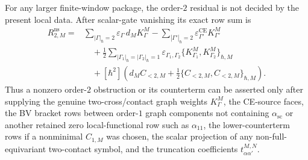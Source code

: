 \begin{prop}
  For any larger finite-window package, the order-\(2\) residual is not
  decided by the present local data.  After scalar-gate vanishing its
  exact row sum is
  \[
  \begin{aligned}
    R^{\mathrm{ns}}_{2,M}
     ={}&
      \sum_{|\Gamma|_\hbar=2}
        \varepsilon_\Gamma\,d_M K^M_\Gamma
      -\sum_{|\Gamma'|_\hbar=2}
        \varepsilon^{\mathrm{CE}}_{\Gamma'}K^M_{\Gamma'}\\
      &\quad
      +\frac12
      \sum_{|\Gamma_1|_\hbar=|\Gamma_2|_\hbar=1}
        \varepsilon_{\Gamma_1,\Gamma_2}
        \{K^M_{\Gamma_1},K^M_{\Gamma_2}\}_{\hbar,M}\\
      &\quad
      +[\hbar^2]\left(
        d_M C_{<2,M}
        +\frac12\{C_{<2,M},C_{<2,M}\}_{\hbar,M}\right).
  \end{aligned}
  \]
  Thus a nonzero order-\(2\) obstruction or its counterterm can be asserted
  only after supplying the genuine two-cross/contact graph weights
  \(K^M_\Gamma\), the CE-source faces, the BV bracket rows between
  order-\(1\) graph components not containing
  \(\alpha_{\mathrm{sc}}\) or another retained zero local-functional row
  such as \(\alpha_{11}\), the
  lower-counterterm rows if a nonminimal \(C_{1,M}\) was chosen, the scalar
  projection of any non-full-equivariant two-contact symbol, and the
  truncation coefficients \(t^{M,N}_{\alpha\alpha'}\).
\end{prop}

